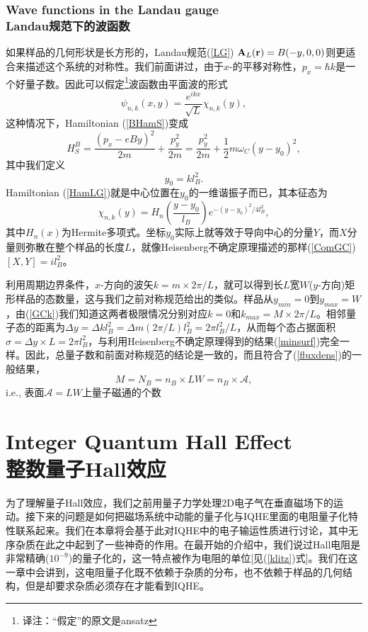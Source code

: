 \documentclass[10pt]{book}
\newcommand{\br}{{\bf r}}
\newcommand{\bA}{{\bf A}}
\newcommand{\Amath}{\mathcal{A}}
\newcommand{\beq}{\begin{equation}}
\newcommand{\eeq}{\end{equation}}
\begin{document}
\subsection[Landau规范下的波函数]{Wave functions in the Landau gauge\\\bf Landau规范下的波函数}
\label{WFLandau}

如果样品的几何形状是长方形的，Landau规范(\ref{LG}) $\bA_L(\br)=B(-y,0,0)$则更适合来描述这个系统的对称性。我们前面讲过，由于$x$-的平移对称性，$p_x=\hbar k$是一个好量子数。因此可以假定\footnote{译注：``假定''的原文是ansatz}波函数由平面波的形式
$$\psi_{n,k}(x,y) = \frac{e^{ikx}}{\sqrt{L}}\chi_{n,k}(y),
$$
这种情况下，Hamiltonian (\ref{BHamS})变成
\beq\label{HamLG}
H_S^B= \frac{(p_x- eBy)^2}{2m} + \frac{p_y^2}{2m} = \frac{p_y^2}{2m} + \frac{1}{2} m\omega_C (y-y_0)^2,
\eeq
其中我们定义
\beq\label{GCk}
y_0 = kl_B^2.
\eeq
Hamiltonian (\ref{HamLG})就是中心位置在$y_0$的一维谐振子而已，其本征态为
$$\chi_{n,k}(y)=H_n\left(\frac{y-y_0}{l_B}\right)e^{-(y-y_0)^2/4l_B^2},$$
其中$H_n(x)$为Hermite多项式\cite{CT}。坐标$y_0$实际上就等效于导向中心的分量$Y$，而$X$分量则弥散在整个样品的长度$L$，就像Heisenberg不确定原理描述的那样(\ref{ComGC})$[X,Y]=il_B^2$。

利用周期边界条件，$x$-方向的波矢$k=m\times 2\pi/L$，就可以得到长$L$宽$W$($y$-方向)矩形样品的态数量，这与我们之前对称规范给出的类似。样品从$y_{min}=0$到$y_{max}=W$，由(\ref{GCk})我们知道这两者极限情况分别对应$k=0$和$k_{max}=M \times 2\pi/L$。相邻量子态的距离为$\Delta y=\Delta k l_B^2=\Delta m (2\pi/L) l_B^2 = 2\pi l_B^2/L$，从而每个态占据面积$\sigma=\Delta y\times L=2\pi l_B^2$，与利用Heisenberg不确定原理得到的结果(\ref{minsurf})完全一样。因此，总量子数和前面对称规范的结论是一致的，而且符合了(\ref{fluxdens})的一般结果，
$$M=N_B= n_B\times LW = n_B \times \Amath,$$
i.e., 表面$\Amath=LW$上量子磁通的个数


\chapter[整数量子Hall效应]{Integer Quantum Hall Effect\\\bf 整数量子Hall效应}
\label{IQHE}


为了理解量子Hall效应，我们之前用量子力学处理2D电子气在垂直磁场下的运动。接下来的问题是如何把磁场系统中动能的量子化与IQHE里面的电阻量子化特性联系起来。我们在本章将会基于此对IQHE中的电子输运性质进行讨论，其中无序杂质在此之中起到了一些神奇的作用。在最开始的介绍中，我们说过Hall电阻是非常精确($10^{-9}$)的量子化的，这一特点被作为电阻的单位[见(\ref{klitz})式]。我们在这一章中会讲到，这电阻量子化既不依赖于杂质的分布，也不依赖于样品的几何结构，但是却要求杂质必须存在才能看到IQHE。
\end{document}
